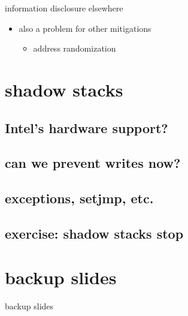 \begin{frame}{information disclosure elsewhere}
    \begin{itemize}
    \item also a problem for other mitigations
        \begin{itemize}
        \item address randomization
        \end{itemize}
    \end{itemize}
\end{frame}

\section{shadow stacks}


\subsection{Intel's hardware support?}


\subsection{can we prevent writes now?}


\subsection{exceptions, setjmp, etc.}


\subsection{exercise: shadow stacks stop}



\section{backup slides}
\begin{frame}{backup slides}
\end{frame}


